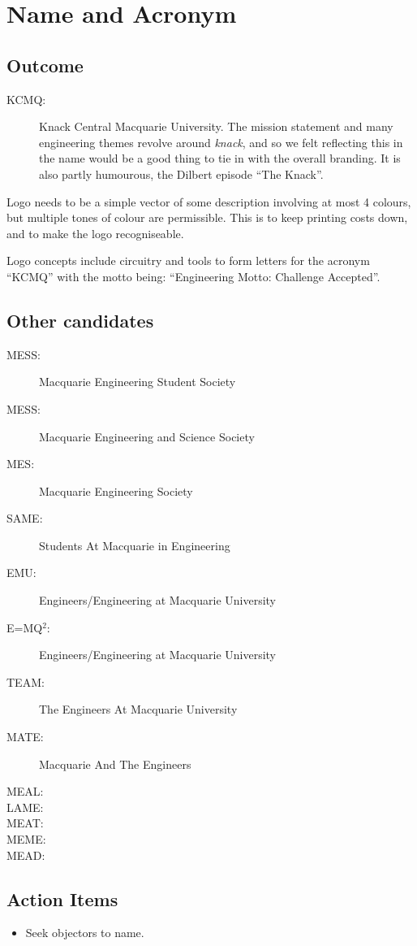 \section{Name and Acronym}
\label{sec:NameAndAcronym}
\subsection{Outcome}
\begin{description}
  \item[KCMQ:] Knack Central Macquarie University. The mission statement and
  many engineering themes revolve around \emph{knack}, and so we felt reflecting
  this in the name would be a good thing to tie in with the overall branding. It
  is also partly humourous, the Dilbert episode ``The Knack''.
\end{description}

Logo needs to be a simple vector of some description involving at most 4
colours, but multiple tones of colour are permissible. This is to keep printing
costs down, and to make the logo recogniseable.

Logo concepts include circuitry and tools to form letters for the acronym
``KCMQ'' with the motto being: ``Engineering Motto: Challenge Accepted''.


\subsection{Other candidates}
\begin{description}
  \item[MESS:] Macquarie Engineering Student Society
  \item[MESS:] Macquarie Engineering and Science Society
  \item[MES:] Macquarie Engineering Society
  \item[SAME:] Students At Macquarie in Engineering
  \item[EMU:] Engineers/Engineering at Macquarie University
  \item[E=MQ$^2$:] Engineers/Engineering at Macquarie University
  \item[TEAM:] The Engineers At Macquarie University
  \item[MATE:] Macquarie And The Engineers
  \item[MEAL:]
  \item[LAME:]
  \item[MEAT:]
  \item[MEME:]
  \item[MEAD:]
\end{description}

\subsection{Action Items}
\begin{itemize}
  \item Seek objectors to name.
\end{itemize}